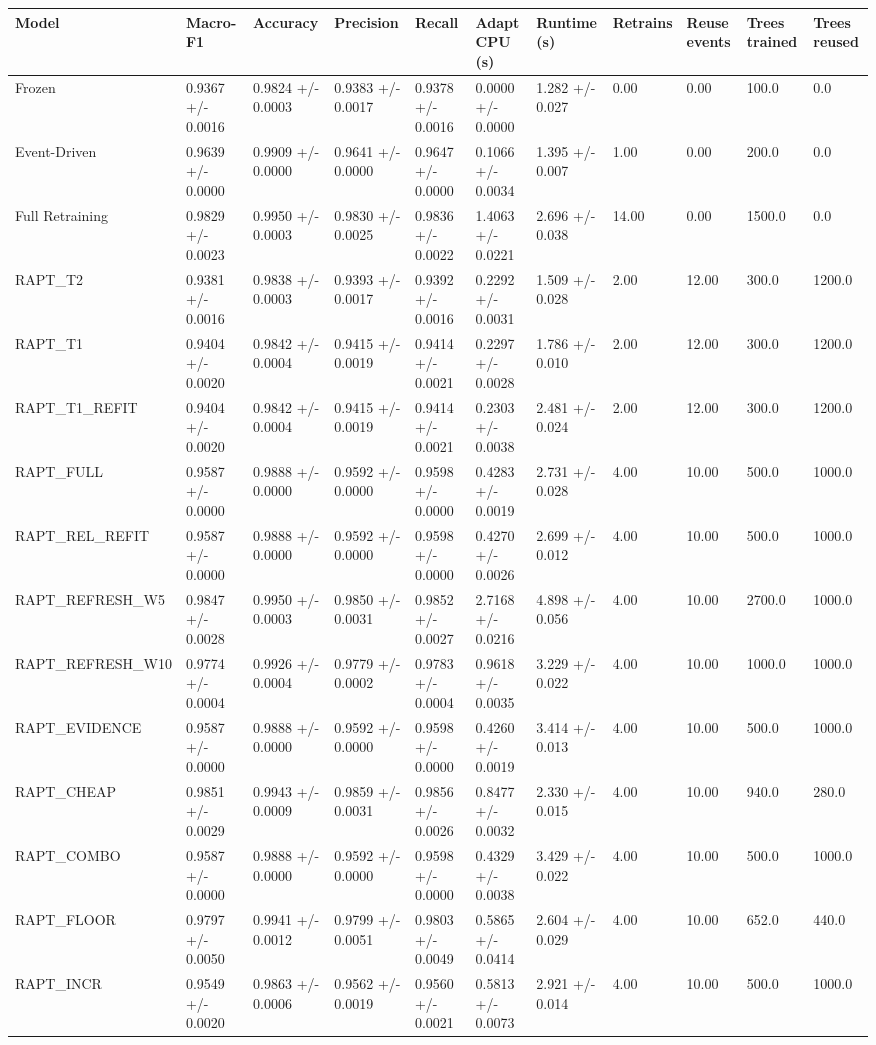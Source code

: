 \begin{tabular}{lllllllllll}
\toprule
Model & Macro-F1 & Accuracy & Precision & Recall & Adapt CPU (s) & Runtime (s) & Retrains & Reuse events & Trees trained & Trees reused \\
\midrule
Frozen & 0.9367 +/- 0.0016 & 0.9824 +/- 0.0003 & 0.9383 +/- 0.0017 & 0.9378 +/- 0.0016 & 0.0000 +/- 0.0000 & 1.282 +/- 0.027 & 0.00 & 0.00 & 100.0 & 0.0 \\
Event-Driven & 0.9639 +/- 0.0000 & 0.9909 +/- 0.0000 & 0.9641 +/- 0.0000 & 0.9647 +/- 0.0000 & 0.1066 +/- 0.0034 & 1.395 +/- 0.007 & 1.00 & 0.00 & 200.0 & 0.0 \\
Full Retraining & 0.9829 +/- 0.0023 & 0.9950 +/- 0.0003 & 0.9830 +/- 0.0025 & 0.9836 +/- 0.0022 & 1.4063 +/- 0.0221 & 2.696 +/- 0.038 & 14.00 & 0.00 & 1500.0 & 0.0 \\
RAPT_T2 & 0.9381 +/- 0.0016 & 0.9838 +/- 0.0003 & 0.9393 +/- 0.0017 & 0.9392 +/- 0.0016 & 0.2292 +/- 0.0031 & 1.509 +/- 0.028 & 2.00 & 12.00 & 300.0 & 1200.0 \\
RAPT_T1 & 0.9404 +/- 0.0020 & 0.9842 +/- 0.0004 & 0.9415 +/- 0.0019 & 0.9414 +/- 0.0021 & 0.2297 +/- 0.0028 & 1.786 +/- 0.010 & 2.00 & 12.00 & 300.0 & 1200.0 \\
RAPT_T1_REFIT & 0.9404 +/- 0.0020 & 0.9842 +/- 0.0004 & 0.9415 +/- 0.0019 & 0.9414 +/- 0.0021 & 0.2303 +/- 0.0038 & 2.481 +/- 0.024 & 2.00 & 12.00 & 300.0 & 1200.0 \\
RAPT_FULL & 0.9587 +/- 0.0000 & 0.9888 +/- 0.0000 & 0.9592 +/- 0.0000 & 0.9598 +/- 0.0000 & 0.4283 +/- 0.0019 & 2.731 +/- 0.028 & 4.00 & 10.00 & 500.0 & 1000.0 \\
RAPT_REL_REFIT & 0.9587 +/- 0.0000 & 0.9888 +/- 0.0000 & 0.9592 +/- 0.0000 & 0.9598 +/- 0.0000 & 0.4270 +/- 0.0026 & 2.699 +/- 0.012 & 4.00 & 10.00 & 500.0 & 1000.0 \\
RAPT_REFRESH_W5 & 0.9847 +/- 0.0028 & 0.9950 +/- 0.0003 & 0.9850 +/- 0.0031 & 0.9852 +/- 0.0027 & 2.7168 +/- 0.0216 & 4.898 +/- 0.056 & 4.00 & 10.00 & 2700.0 & 1000.0 \\
RAPT_REFRESH_W10 & 0.9774 +/- 0.0004 & 0.9926 +/- 0.0004 & 0.9779 +/- 0.0002 & 0.9783 +/- 0.0004 & 0.9618 +/- 0.0035 & 3.229 +/- 0.022 & 4.00 & 10.00 & 1000.0 & 1000.0 \\
RAPT_EVIDENCE & 0.9587 +/- 0.0000 & 0.9888 +/- 0.0000 & 0.9592 +/- 0.0000 & 0.9598 +/- 0.0000 & 0.4260 +/- 0.0019 & 3.414 +/- 0.013 & 4.00 & 10.00 & 500.0 & 1000.0 \\
RAPT_CHEAP & 0.9851 +/- 0.0029 & 0.9943 +/- 0.0009 & 0.9859 +/- 0.0031 & 0.9856 +/- 0.0026 & 0.8477 +/- 0.0032 & 2.330 +/- 0.015 & 4.00 & 10.00 & 940.0 & 280.0 \\
RAPT_COMBO & 0.9587 +/- 0.0000 & 0.9888 +/- 0.0000 & 0.9592 +/- 0.0000 & 0.9598 +/- 0.0000 & 0.4329 +/- 0.0038 & 3.429 +/- 0.022 & 4.00 & 10.00 & 500.0 & 1000.0 \\
RAPT_FLOOR & 0.9797 +/- 0.0050 & 0.9941 +/- 0.0012 & 0.9799 +/- 0.0051 & 0.9803 +/- 0.0049 & 0.5865 +/- 0.0414 & 2.604 +/- 0.029 & 4.00 & 10.00 & 652.0 & 440.0 \\
RAPT_INCR & 0.9549 +/- 0.0020 & 0.9863 +/- 0.0006 & 0.9562 +/- 0.0019 & 0.9560 +/- 0.0021 & 0.5813 +/- 0.0073 & 2.921 +/- 0.014 & 4.00 & 10.00 & 500.0 & 1000.0 \\
\bottomrule
\end{tabular}
